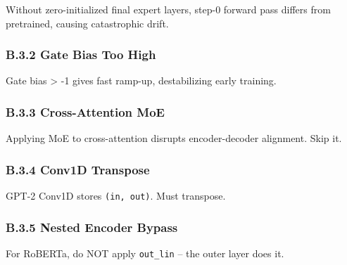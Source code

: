 Without zero-initialized final expert layers, step-0 forward pass differs 
from pretrained, causing catastrophic drift.

\subsubsection{B.3.2 Gate Bias Too High}

Gate bias > -1 gives fast ramp-up, destabilizing early training.

\subsubsection{B.3.3 Cross-Attention MoE}

Applying MoE to cross-attention disrupts encoder-decoder alignment. Skip it.

\subsubsection{B.3.4 Conv1D Transpose}

GPT-2 Conv1D stores \texttt{(in, out)}. Must transpose.

\subsubsection{B.3.5 Nested Encoder Bypass}

For RoBERTa, do NOT apply \texttt{out\_lin} -- the outer layer does it.